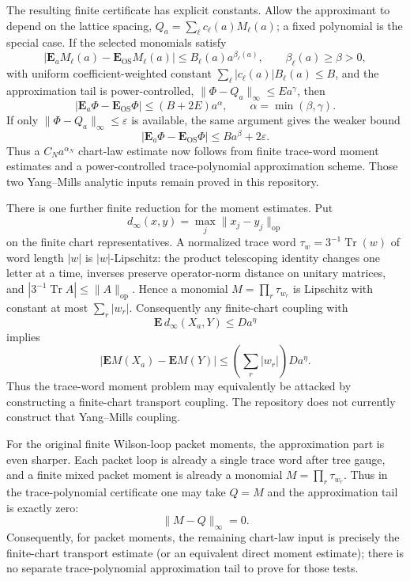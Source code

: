 The resulting finite certificate has explicit constants. Allow the approximant
to depend on the lattice spacing,
$Q_a=\sum_\ell c_\ell(a)M_\ell(a)$; a fixed polynomial is the special case. If
the selected monomials satisfy
\[
  \left|\mathbf E_a M_\ell(a)-\mathbf E_{\mathrm{OS}}M_\ell(a)\right|
  \leq B_\ell(a)a^{\beta_\ell(a)},\qquad
  \beta_\ell(a)\geq\beta>0,
\]
with uniform coefficient-weighted constant
$\sum_\ell |c_\ell(a)|B_\ell(a)\leq B$, and the approximation tail is
power-controlled, $\|\Phi-Q_a\|_\infty\leq E a^\gamma$, then
\[
  \left|\mathbf E_a\Phi-\mathbf E_{\mathrm{OS}}\Phi\right|
  \leq
  \left(B+2E\right)a^\alpha,
  \qquad
  \alpha=\min(\beta,\gamma).
\]
If only $\|\Phi-Q_a\|_\infty\leq\varepsilon$ is available, the same argument gives
the weaker bound
\[
  \left|\mathbf E_a\Phi-\mathbf E_{\mathrm{OS}}\Phi\right|
  \leq
  Ba^\beta
  +2\varepsilon .
\]
Thus a $C_Na^{\alpha_N}$ chart-law estimate now follows from finite
trace-word moment estimates and a power-controlled trace-polynomial
approximation scheme. Those two Yang--Mills analytic inputs remain proved in
this repository.

There is one further finite reduction for the moment estimates. Put
\[
  d_\infty(x,y)=\max_j\|x_j-y_j\|_{\operatorname{op}}
\]
on the finite chart representatives. A normalized trace word
$\tau_w=3^{-1}\operatorname{Tr}(w)$ of word length $|w|$ is $|w|$-Lipschitz:
the product telescoping identity changes one letter at a time, inverses
preserve operator-norm distance on unitary matrices, and
$|3^{-1}\operatorname{Tr}A|\leq\|A\|_{\operatorname{op}}$. Hence a monomial
$M=\prod_r\tau_{w_r}$ is Lipschitz with constant at most
$\sum_r |w_r|$. Consequently any finite-chart coupling with
\[
  \mathbf E\,d_\infty(X_a,Y)\leq D a^\eta
\]
implies
\[
  \left|\mathbf E M(X_a)-\mathbf E M(Y)\right|
  \leq \left(\sum_r |w_r|\right)D a^\eta .
\]
Thus the trace-word moment problem may equivalently be attacked by constructing
a finite-chart transport coupling. The repository does not currently construct
that Yang--Mills coupling.

For the original finite Wilson-loop packet moments, the approximation part is
even sharper. Each packet loop is already a single trace word after tree gauge,
and a finite mixed packet moment is already a monomial
$M=\prod_r\tau_{w_r}$. Thus in the trace-polynomial certificate one may take
$Q=M$ and the approximation tail is exactly zero:
\[
  \|M-Q\|_\infty=0.
\]
Consequently, for packet moments, the remaining chart-law input is precisely
the finite-chart transport estimate (or an equivalent direct moment estimate);
there is no separate trace-polynomial approximation tail to prove for those
tests.

